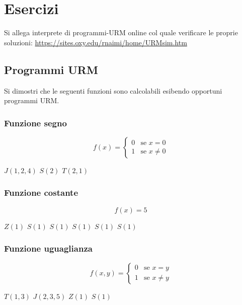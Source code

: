 	\section{Esercizi}
	Si allega interprete di programmi-URM online col quale verificare le proprie soluzioni: \url{https://sites.oxy.edu/rnaimi/home/URMsim.htm}
	\subsection{Programmi URM}
	Si dimostri che le seguenti funzioni sono calcolabili esibendo opportuni programmi URM.
	
\subsubsection{Funzione segno}
$$
f(x) = \begin{cases}
	0 & \text{se } x=0\\
	1 & \text{se } x\neq 0
\end{cases}
$$

\begin{algorithm}[H]
	\caption{Funzione segno}
	\begin{algorithmic}[1]
		\State $J(1,2,4)$
		\State $S(2)$
		\State $T(2,1)$
	\end{algorithmic}
\end{algorithm}

\subsubsection{Funzione costante}
$$
f(x) = 5
$$

\begin{algorithm}[H]
	\caption{Funzione costante}
	\begin{algorithmic}[1]
		\State $Z(1)$
		\State $S(1)$
		\State $S(1)$
		\State $S(1)$
		\State $S(1)$
		\State $S(1)$
	\end{algorithmic}
\end{algorithm}

\subsubsection{Funzione uguaglianza}
$$
f(x, y) = \begin{cases}
	0 & \text{se } x=y\\
	1 & \text{se } x\neq y
\end{cases}
$$

\begin{algorithm}[H]
	\caption{Funzione uguaglianza}
	\begin{algorithmic}[1]
		\State $T(1,3)$
		\State $J(2,3,5)$
		\State $Z(1)$
		\State $S(1)$
	\end{algorithmic}
\end{algorithm}

